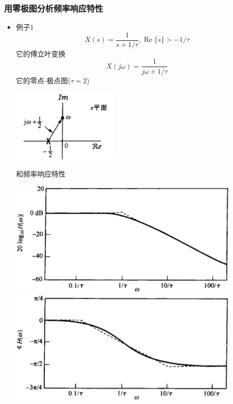 \documentclass[CJKutf8,dvipsnames,table]{beamer}
\begin{document}
\begin{CJK*}{UTF8}{song}
  \begin{frame}
    \frametitle{用零极图分析频率响应特性}
    \begin{itemize}
    \item 例子1   
\[
X(s)=\frac{1}{s+1/\tau}, \operatorname{Re}\{s\} > -1/\tau
\]
它的傅立叶变换
\[
X(j\omega)=\frac{1}{j\omega+1/\tau}
\]
它的零点-极点图($\tau=2$)
    \begin{center}
      \includegraphics[scale=.5]{ss-c-f9-16}
    \end{center}
    和频率响应特性
    \begin{center}
      \includegraphics[scale=.27]{ss-c-f9-18a}
      \includegraphics[scale=.27]{ss-c-f9-18b}
    \end{center}

    \end{itemize}
     
  \end{frame}     
  

\end{CJK*}
\end{document}
